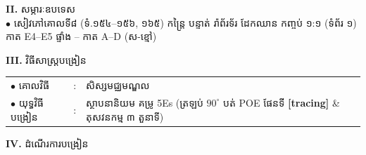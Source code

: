 \documentclass[a4paper,10pt]{article}
\newcommand{\cnum}[1]{{\fontsize{10.5pt}{12pt}\selectfont\ding{\numexpr181+#1\relax}}\hspace{0.2em}}
\begin{document}
{\vspace{2pt}

\textbf{II.} {\muol សម្ភារៈឧបទេស}\\[2pt]
\hspace*{0.55cm}$\bullet$ \hspace{0.35cm} សៀវភៅគោលទី៨ (ទំ.១៥៤--១៥៦, ១៦៥) កន្ត្រៃ បន្ទាត់ រ៉ាព័រទ័រ ដែកឈាន កញ្ចប់ ១:១ (ទំព័រ ១) កាត E4--E5 ផ្ទាំង \cnum{1}--\cnum{5} កាត A--D (ស-ខ្មៅ)

\vspace{2pt}

\textbf{III.} {\muol វិធីសាស្រ្តបង្រៀន}\\[2pt]
\hspace*{0.55cm}%
\begin{tabular}{@{}l l l@{}}
  $\bullet$ \hspace{0.35cm} គោលវិធី & : \hspace{0.7cm} & សិស្សមជ្ឈមណ្ឌល \\
  $\bullet$ \hspace{0.35cm} យុទ្ធវិធីបង្រៀន & : & ស្ថាបនានិយម គម្រូ 5Es (ត្រឡប់ $90^\circ$ បត់ POE ផែនទី \textbf{[tracing]} \& តុសវនកម្ម ៣ តួនាទី) \\
\end{tabular}
}

\vspace{2pt}

\textbf{IV.} {\muol ដំណើរការបង្រៀន}
\end{document}
